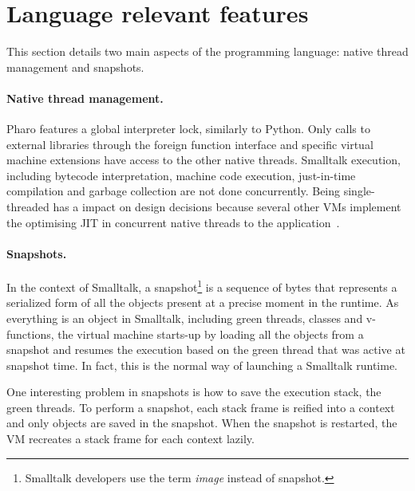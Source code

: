 \documentclass[a4paper,12pt,twoside]{../includes/ThesisStyle}
\begin{document}

\section{Language relevant features}

This section details two main aspects of the programming language: native thread management and snapshots.

\paragraph{Native thread management.}

Pharo features a global interpreter lock, similarly to Python. Only calls to external libraries through the foreign function interface and specific virtual machine extensions have access to the other native threads. Smalltalk execution, including bytecode interpretation, machine code execution, just-in-time compilation and garbage collection are not done concurrently. Being single-threaded has a impact on design decisions because several other VMs implement the optimising JIT in concurrent native threads to the application~\cite{Arn00}.


\paragraph{Snapshots.}
\label{par:snapshot}

In the context of Smalltalk, a snapshot\footnote{Smalltalk developers use the term \emph{image} instead of snapshot.} is a sequence of bytes that represents a serialized form of all the objects present at a precise moment in the runtime. As everything is an object in Smalltalk, including green threads, classes and v-functions, the virtual machine starts-up by loading all the objects from a snapshot and resumes the execution based on the green thread that was active at snapshot time. In fact, this is the normal way of launching a Smalltalk runtime. 

One interesting problem in snapshots is how to save the execution stack, \ie the green threads. To perform a snapshot, each stack frame is reified into a context and only objects are saved in the snapshot. When the snapshot is restarted, the VM recreates a stack frame for each context lazily. 
\end{document}
